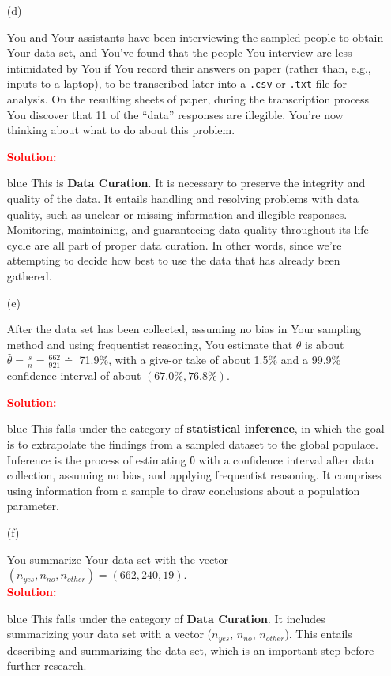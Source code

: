 \documentclass[12pt]{article}
\renewcommand{\t}[1]{\texttt{#1}}
\begin{document}
\begin{itemize}
\begin{itemize}
\item[(d)]

You and Your assistants have been interviewing the sampled people to obtain Your data set, and You've found that the people You interview are less intimidated by You if You record their answers on paper (rather than, e.g., inputs to a laptop), to be transcribed later into a \t{.csv} or \t{.txt} file for analysis. On the resulting sheets of paper, during the transcription process You discover that 11 of the ``data'' responses are illegible. You're now thinking about what to do about this problem.

\textbf{\textcolor{red}{Solution:}}
\begin{Solution3}{blue}
This is \textbf{Data Curation}. It is necessary to preserve the integrity and quality of the data. It entails handling and resolving problems with data quality, such as unclear or missing information and illegible responses. Monitoring, maintaining, and guaranteeing data quality throughout its life cycle are all part of proper data curation. In other words, since we're attempting to decide how best to use the data that has already been gathered.
\end{Solution3}

\vspace*{0.6in}

\item[(e)]

After the data set has been collected, assuming no bias in Your sampling method and using frequentist reasoning, You estimate that $\theta$ is about $\hat{ \theta } = \frac{ s }{ n } = \frac{ 662 }{ 921 } \doteq$ 71.9\%, with a give-or take of about 1.5\% and a 99.9\% confidence interval of about $( 67.0\%, 76.8\% )$.

\textbf{\textcolor{red}{Solution:}}
\begin{Solution3}{blue}
This falls under the category of \textbf{statistical inference}, in which the goal is to extrapolate the findings from a sampled dataset to the global populace. Inference is the process of estimating θ with a confidence interval after data collection, assuming no bias, and applying frequentist reasoning. It comprises using information from a sample to draw conclusions about a population parameter.
\end{Solution3}
\vspace*{0.6in}

\item[(f)]

You summarize Your data set with the vector $( n_{ yes }, n_{ no }, n_{ other } ) = ( 662, 240, 19 )$. \\
\textbf{\textcolor{red}{Solution:}}
\begin{Solution3}{blue}
This falls under the category of \textbf{Data Curation}. It includes summarizing your data set with a vector ($n_{yes}$, $n_{no}$, $n_{ other}$). This entails describing and summarizing the data set, which is an important step before further research.
\end{Solution3}
\vspace*{0.6in}


\end{itemize}
\end{itemize}
\end{document}
